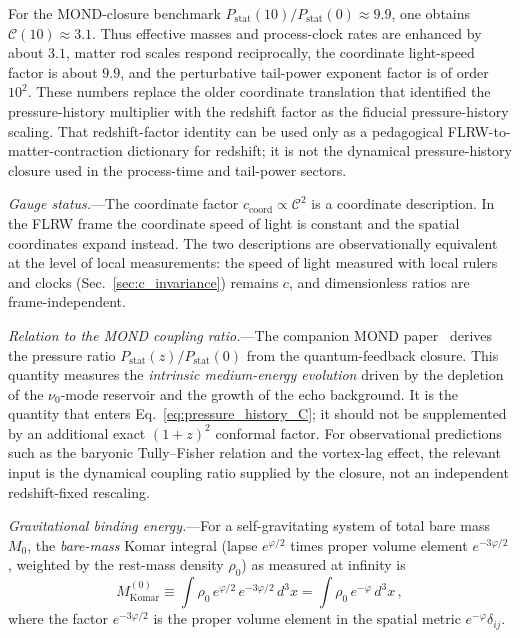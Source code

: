 \documentclass[aps,prd,onecolumn,superscriptaddress,nofootinbib,showpacs,12pt]{revtex4-2}
\begin{document}
For the MOND-closure benchmark
$P_{\mathrm{stat}}(10)/P_{\mathrm{stat}}(0)\approx9.9$,
one obtains $\mathcal{C}(10)\approx3.1$.  Thus effective
masses and process-clock rates are enhanced by about
$3.1$, matter rod scales respond reciprocally, the
coordinate light-speed factor is about $9.9$, and the
perturbative tail-power exponent factor is of order
$10^2$.  These numbers replace the older coordinate
translation that identified the pressure-history multiplier
with the redshift factor as the fiducial pressure-history
scaling.  That redshift-factor identity can be used only as
a pedagogical FLRW-to-matter-contraction dictionary for
redshift; it is not the dynamical pressure-history closure
used in the process-time and tail-power sectors.

\emph{Gauge status.}---The coordinate factor
$c_{\mathrm{coord}}\propto\mathcal{C}^2$ is a coordinate
description.  In the FLRW frame the coordinate speed of
light is constant and the spatial coordinates expand
instead.  The two descriptions are observationally
equivalent at the level of local measurements: the speed
of light measured with local rulers and clocks
(Sec.~\ref{sec:c_invariance}) remains $c$, and
dimensionless ratios are frame-independent.

\textit{Relation to the MOND coupling
ratio.}---The companion MOND
paper~\cite{Lotishvili2026MOND} derives the
pressure ratio
$P_{\mathrm{stat}}(z)/P_{\mathrm{stat}}(0)$ from the
quantum-feedback closure.  This quantity measures the
\emph{intrinsic medium-energy evolution} driven by
the depletion of the $\nu_0$-mode reservoir
and the growth of the echo background.  It is the
quantity that enters Eq.~\eqref{eq:pressure_history_C};
it should not be supplemented by an additional exact
$(1+z)^2$ conformal factor.  For observational predictions
such as the baryonic Tully--Fisher relation and the
vortex-lag effect, the relevant input is the dynamical
coupling ratio supplied by the closure, not an independent
redshift-fixed rescaling.

\textit{Gravitational binding energy.}---For a
self-gravitating system of total bare mass $M_{0}$, the
\emph{bare-mass} Komar integral (lapse $e^{\varphi/2}$
times proper volume element $e^{-3\varphi/2}$, weighted
by the rest-mass density $\rho_0$) as measured at
infinity is
\begin{equation}\label{eq:komar}
  M_{\mathrm{Komar}}^{(0)} \equiv
  \int \rho_{0}\,e^{\varphi/2}\,
  e^{-3\varphi/2}\,d^{3}x
  = \int \rho_{0}\,e^{-\varphi}\,d^{3}x\,,
\end{equation}
where the factor $e^{-3\varphi/2}$ is the proper volume
element in the spatial metric $e^{-\varphi}\delta_{ij}$.
\end{document}
